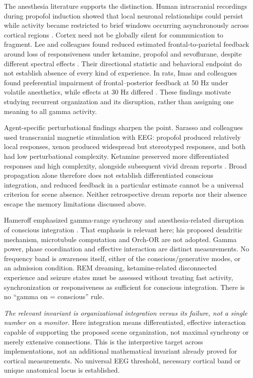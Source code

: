 The anesthesia literature supports the distinction. Human intracranial recordings during propofol induction showed that local neuronal relationships could persist while activity became restricted to brief windows occurring asynchronously across cortical regions \cite{Lewis2012}. Cortex need not be globally silent for communication to fragment. Lee and colleagues found reduced estimated frontal-to-parietal feedback around loss of responsiveness under ketamine, propofol and sevoflurane, despite different spectral effects \cite{Lee2013}. Their directional statistic and behavioral endpoint do not establish absence of every kind of experience. In rats, Imas and colleagues found preferential impairment of frontal--posterior feedback at 50 Hz under volatile anesthetics, while effects at 30 Hz differed \cite{Imas2005}. These findings motivate studying recurrent organization and its disruption, rather than assigning one meaning to all gamma activity.

Agent-specific perturbational findings sharpen the point. Sarasso and colleagues used transcranial magnetic stimulation with EEG: propofol produced relatively local responses, xenon produced widespread but stereotyped responses, and both had low perturbational complexity. Ketamine preserved more differentiated responses and high complexity, alongside subsequent vivid dream reports \cite{Sarasso2015}. Broad propagation alone therefore does not establish differentiated conscious integration, and reduced feedback in a particular estimate cannot be a universal criterion for scene absence. Neither retrospective dream reports nor their absence escape the memory limitations discussed above.

Hameroff emphasized gamma-range synchrony and anesthesia-related disruption of conscious integration \cite{Hameroff2010}. That emphasis is relevant here; his proposed dendritic mechanism, microtubule computation and Orch-OR are not adopted. Gamma power, phase coordination and effective interaction are distinct measurements. No frequency band is awareness itself, either of the conscious/generative modes, or an admission condition. REM dreaming, ketamine-related disconnected experience and seizure states must be assessed without treating fast activity, synchronization or responsiveness as sufficient for conscious integration. There is no ``gamma on = conscious'' rule.

\emph{The relevant invariant is organizational integration versus its failure, not a single number on a monitor.} Here integration means differentiated, effective interaction capable of supporting the proposed scene organization, not maximal synchrony or merely extensive connections. This is the interpretive target across implementations, not an additional mathematical invariant already proved for cortical measurements. No universal EEG threshold, necessary cortical band or unique anatomical locus is established.


